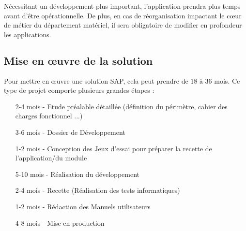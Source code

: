 Nécessitant un développement plus important, l'application prendra plus temps
avant d'être opérationnelle. De plus, en cas de réorganisation
impactant le cœur de métier du département matériel, il sera obligatoire de modifier
en profondeur les applications. 

\subsection{Mise en œuvre de la solution}
Pour mettre en œuvre une solution SAP, cela peut prendre de 18 à 36 mois.
Ce type de projet comporte plusieurs grandes étapes :

\begin{itemize}
	\item[2-4 mois -] Etude préalable détaillée (définition du périmètre, cahier des charges fonctionnel ...)
	\item[3-6 mois -] Dossier de Développement
	\item[1-2 mois -] Conception des Jeux d’essai pour préparer la recette de l'application/du module
	\item[5-10 mois -] Réalisation du développement
	\item[2-4 mois -] Recette (Réalisation des tests informatiques)
	\item[1-2 mois -] Rédaction des Manuels utilisateurs
	\item[4-8 mois -] Mise en production
\end{itemize}

\vfil
\pagebreak

